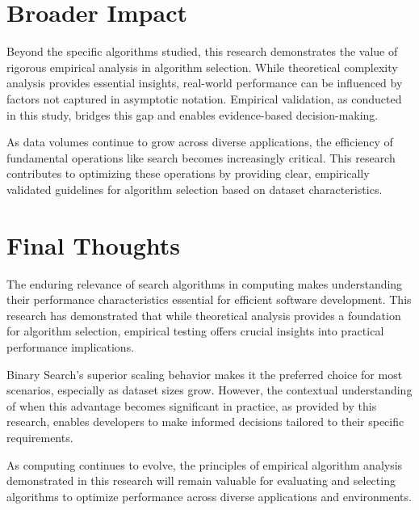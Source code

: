 \section{Broader Impact}

Beyond the specific algorithms studied, this research demonstrates the value of rigorous empirical analysis in algorithm selection. While theoretical complexity analysis provides essential insights, real-world performance can be influenced by factors not captured in asymptotic notation. Empirical validation, as conducted in this study, bridges this gap and enables evidence-based decision-making.

As data volumes continue to grow across diverse applications, the efficiency of fundamental operations like search becomes increasingly critical. This research contributes to optimizing these operations by providing clear, empirically validated guidelines for algorithm selection based on dataset characteristics.

\section{Final Thoughts}

The enduring relevance of search algorithms in computing makes understanding their performance characteristics essential for efficient software development. This research has demonstrated that while theoretical analysis provides a foundation for algorithm selection, empirical testing offers crucial insights into practical performance implications.

Binary Search's superior scaling behavior makes it the preferred choice for most scenarios, especially as dataset sizes grow. However, the contextual understanding of when this advantage becomes significant in practice, as provided by this research, enables developers to make informed decisions tailored to their specific requirements.

As computing continues to evolve, the principles of empirical algorithm analysis demonstrated in this research will remain valuable for evaluating and selecting algorithms to optimize performance across diverse applications and environments.